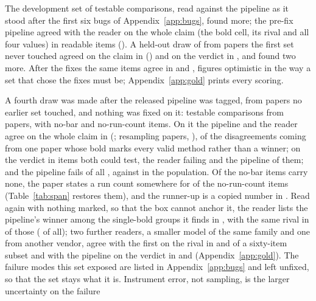 \documentclass{article}
\begin{document}
The development set of \nGoldDevN{} testable comparisons, read against the
pipeline as it stood after the first six bugs of Appendix~\ref{app:bugs},
found \nGoldDevBugs{} more; the pre-fix pipeline agreed with the reader on the
whole claim (the bold cell, its rival and all four values) in \nGoldDevClaimFrac{}
readable items (\nGoldDevClaim{}). A held-out draw of \nGoldHeldN{} from
papers the first set never touched agreed on the claim in
\nGoldHeldClaimFrac{} (\nGoldHeldClaim{}) and on the verdict in
\nGoldHeldAgree{}, and found two more. After the fixes the same items
agree in \nGoldDevPostClaimFrac{} and \nGoldHeldPostClaimFrac{}, figures
optimistic in the way a set that chose the fixes must be; Appendix~\ref{app:gold}
prints every scoring.

A fourth draw was made after the released pipeline was tagged, from papers no
earlier set touched, and nothing was fixed on it: \nGoldFrozenN{} testable
comparisons from \nGoldFrozenPapers{} papers, with \nGoldFrozenNoBarN{} no-bar
and \nGoldFrozenNoNN{} no-run-count items. On it the pipeline and the reader
agree on the whole claim in \nGoldFrozenClaimFrac{} (\nGoldFrozenClaim{};
resampling papers, \nGoldFrozenClaimPaperCi{}), \nGoldFrozenOnePaper{} of the
\nGoldFrozenDisagreements{} disagreements coming from one paper whose bold
marks every valid method rather than a winner; on the verdict in
\nGoldFrozenAgree{} items both could test, the reader failing
\nGoldFrozenFailReader{} and the pipeline \nGoldFrozenFailPipe{} of them; and
the pipeline fails \nGoldFrozenPipeFailAll{} of all \nGoldFrozenN{}, against
\nPctFail{} in the population. Of the no-bar items
\nGoldFrozenNoBarAbsentFrac{} carry none, the paper states a run count
somewhere for \nGoldFrozenNoNFoundFrac{} of the no-run-count items
(Table~\ref{tab:span} restores them), and the runner-up is a copied number in
\nGoldFrozenRivalCopiedFrac{}. Read again with nothing marked, so that the box cannot anchor it, the
reader lists the pipeline's winner among the single-bold groups it finds in
\nNoboxWinnerFoundFrac{}, with the same rival in \nNoboxRivalSameFrac{} of
those (\nNoboxClaim{} of all); two further readers, a smaller model of the same family and one from
another vendor, agree with the first on the rival in \nReadersAgreeRunner{}
and \nReadersThreeAgreeRunner{} of a sixty-item subset and with the pipeline
on the verdict in \nReaderTwoAgree{} and \nReaderThreeAgree{}
(Appendix~\ref{app:gold}). The
failure modes this set exposed are listed in Appendix~\ref{app:bugs} and left
unfixed, so that the set stays what it is. Instrument error, not sampling, is the larger uncertainty on the failure
\end{document}
